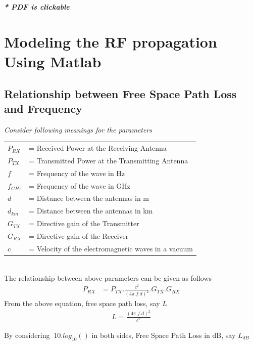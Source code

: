 \documentclass[a4paper,11pt]{article}%
\begin{document}

\tableofcontents

\begin{center}
	\textbf{\textit{* PDF is clickable}}
\end{center}
\pagebreak
\section{Modeling the RF propagation Using Matlab}
\subsection{Relationship between Free Space Path Loss and Frequency}

\textit{Consider  following meanings for the parameters}\\

\begin{tabular}{l l }
	$P_{RX}$ & = Received Power at the Receiving Antenna\\
	$P_{TX}$ & = Transmitted Power at the Transmitting Antenna\\
	$f$ & = Frequency of the wave in Hz\\
	$f_{GHz}$ & = Frequency of the wave in GHz\\
	$d$& = Distance between the antennas in m\\
	$d_{km}$& = Distance between the antennas in km\\
	$G_{TX}$& = Directive gain of the Transmitter\\
	$G_{RX}$& = Directive gain of the Receiver\\
	$c$& = Velocity of the electromagnetic waves in a vacuum\\

\end{tabular}\\[1cm]


The relationship between above parameters can be given as follows
\[
\begin{split}
P_{RX} & = P_{TX}.\frac{c^2}{(4\pi.f.d)^2}.G_{TX}.G_{RX}
\end{split}
\]
From the above equation, free space path loss, say $L$
\[
\begin{split}
L = \frac{(4\pi.f.d)^2}{c^2}
\end{split}
\]

By considering $\ 10.log_{10}()$ in both sides, Free Space Path Loss in dB, say $L_{dB}$
\end{document}
